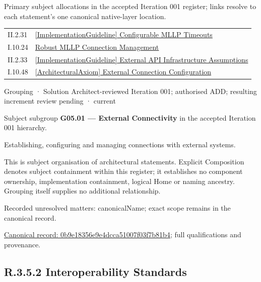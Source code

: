 Primary subject allocations in the accepted Iteration 001 register; links resolve to each statement’s one canonical native-layer location.\par
\begin{longtable}{p{.22\linewidth}p{.73\linewidth}}
II.2.31 & \hyperref[element:267142b7a01a49c686458b9fc1c8d7b2]{[ImplementationGuideline] Configurable MLLP Timeouts} \\
I.10.24 & \hyperref[element:e7b7d94a94194ef28a12051a550d3f3f]{Robust MLLP Connection Management} \\
II.2.33 & \hyperref[element:a0c7aa62c0ff498c91dcd6af011170ce]{[ImplementationGuideline] External API Infrastructure Assumptions} \\
I.10.48 & \hyperref[element:f24e63c49135411bbfbc06f9385aeea5]{[ArchitecturalAxiom] External Connection Configuration} \\
\end{longtable}
\label{element:0b9e18356e9e4dcca51007f03f7b81b4}
{\small Grouping · Solution Architect-reviewed Iteration 001; authorised ADD; resulting increment review pending · current}\par

Subject subgroup \textbf{G05.01 — External Connectivity} in the accepted Iteration 001 hierarchy.



Establishing, configuring and managing connections with external systems.



This is subject organisation of architectural statements. Explicit Composition denotes subject containment within this register; it establishes no component ownership, implementation containment, logical Home or naming ancestry. Grouping itself supplies no additional relationship.


{\small Recorded unresolved matters: canonicalName; exact scope remains in the canonical record.}\par
{\footnotesize \href{../../../../continuum/grouping/0b9e18356e9e4dcca51007f03f7b81b4.md}{Canonical record: 0b9e18356e9e4dcca51007f03f7b81b4}; full qualifications and provenance.}\par
\subsection*{R.3.5.2 Interoperability Standards}
\label{navigation:R.3.5.2}

